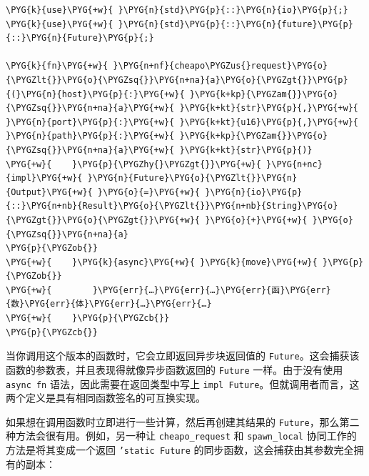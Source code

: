 \begin{Verbatim}[commandchars=\\\{\},breaklines=true,breakanywhere=true,fontsize=\codefont,xleftmargin=17bp]
\PYG{k}{use}\PYG{+w}{ }\PYG{n}{std}\PYG{p}{::}\PYG{n}{io}\PYG{p}{;}
\PYG{k}{use}\PYG{+w}{ }\PYG{n}{std}\PYG{p}{::}\PYG{n}{future}\PYG{p}{::}\PYG{n}{Future}\PYG{p}{;}

\PYG{k}{fn}\PYG{+w}{ }\PYG{n+nf}{cheapo\PYGZus{}request}\PYG{o}{\PYGZlt{}}\PYG{o}{\PYGZsq{}}\PYG{n+na}{a}\PYG{o}{\PYGZgt{}}\PYG{p}{(}\PYG{n}{host}\PYG{p}{:}\PYG{+w}{ }\PYG{k+kp}{\PYGZam{}}\PYG{o}{\PYGZsq{}}\PYG{n+na}{a}\PYG{+w}{ }\PYG{k+kt}{str}\PYG{p}{,}\PYG{+w}{ }\PYG{n}{port}\PYG{p}{:}\PYG{+w}{ }\PYG{k+kt}{u16}\PYG{p}{,}\PYG{+w}{ }\PYG{n}{path}\PYG{p}{:}\PYG{+w}{ }\PYG{k+kp}{\PYGZam{}}\PYG{o}{\PYGZsq{}}\PYG{n+na}{a}\PYG{+w}{ }\PYG{k+kt}{str}\PYG{p}{)}
\PYG{+w}{    }\PYG{p}{\PYGZhy{}\PYGZgt{}}\PYG{+w}{ }\PYG{n+nc}{impl}\PYG{+w}{ }\PYG{n}{Future}\PYG{o}{\PYGZlt{}}\PYG{n}{Output}\PYG{+w}{ }\PYG{o}{=}\PYG{+w}{ }\PYG{n}{io}\PYG{p}{::}\PYG{n+nb}{Result}\PYG{o}{\PYGZlt{}}\PYG{n+nb}{String}\PYG{o}{\PYGZgt{}}\PYG{o}{\PYGZgt{}}\PYG{+w}{ }\PYG{o}{+}\PYG{+w}{ }\PYG{o}{\PYGZsq{}}\PYG{n+na}{a}
\PYG{p}{\PYGZob{}}
\PYG{+w}{    }\PYG{k}{async}\PYG{+w}{ }\PYG{k}{move}\PYG{+w}{ }\PYG{p}{\PYGZob{}}
\PYG{+w}{        }\PYG{err}{…}\PYG{err}{…}\PYG{err}{函}\PYG{err}{数}\PYG{err}{体}\PYG{err}{…}\PYG{err}{…}
\PYG{+w}{    }\PYG{p}{\PYGZcb{}}
\PYG{p}{\PYGZcb{}}
\end{Verbatim}

当你调用这个版本的函数时，它会立即返回异步块返回值的 \texttt{Future}。这会捕获该函数的参数表，并且表现得就像异步函数返回的 \texttt{Future} 一样。由于没有使用 \texttt{async fn} 语法，因此需要在返回类型中写上 \texttt{impl Future}。但就调用者而言，这两个定义是具有相同函数签名的可互换实现。

如果想在调用函数时立即进行一些计算，然后再创建其结果的 \texttt{Future}，那么第二种方法会很有用。例如，另一种让 \texttt{cheapo\_request} 和 \texttt{spawn\_local} 协同工作的方法是将其变成一个返回 \texttt{'static Future} 的同步函数，这会捕获由其参数完全拥有的副本：

